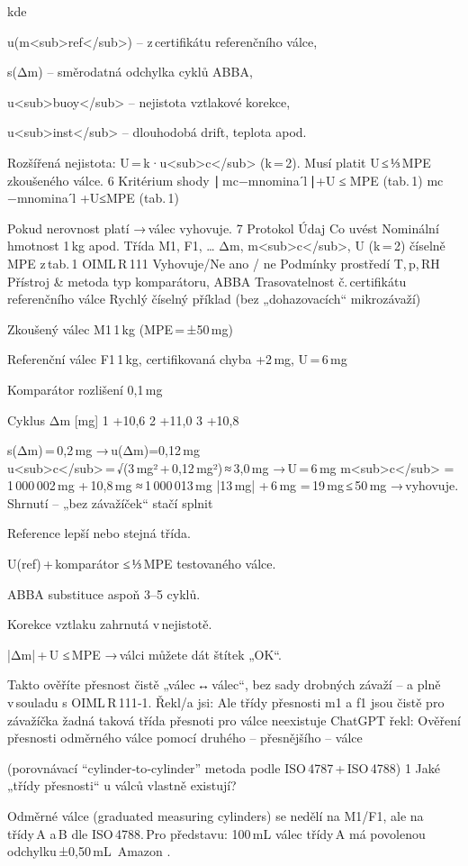 kde

    u(m<sub>ref</sub>) – z certifikátu referenčního válce,

    s(Δm) – směrodatná odchylka cyklů ABBA,

    u<sub>buoy</sub> – nejistota vztlakové korekce,

    u<sub>inst</sub> – dlouhodobá drift, teplota apod.

Rozšířená nejistota: U = k·u<sub>c</sub> (k = 2).
Musí platit U ≤ ⅓ MPE zkoušeného válce.
6  Kritérium shody
∣ mc−mnominaˊl ∣+U  ≤  MPE (tab. 1)
​mc​−mnominaˊl​
​+U≤MPE (tab. 1)

Pokud nerovnost platí → válec vyhovuje.
7  Protokol
Údaj	Co uvést
Nominální hmotnost	1 kg apod.
Třída	M1, F1, …
Δm, m<sub>c</sub>, U (k = 2)	číselně
MPE	z tab. 1 OIML R 111
Vyhovuje/Ne	ano / ne
Podmínky prostředí	T, p, RH
Přístroj & metoda	typ komparátoru, ABBA
Trasovatelnost	č. certifikátu referenčního válce
Rychlý číselný příklad (bez „dohazovacích“ mikrozávaží)

    Zkoušený válec M1 1 kg (MPE = ±50 mg)

    Referenční válec F1 1 kg, certifikovaná chyba +2 mg, U = 6 mg

    Komparátor rozlišení 0,1 mg

Cyklus	Δm [mg]
1	+10,6
2	+11,0
3	+10,8

s(Δm) = 0,2 mg → u(Δm)=0,12 mg
u<sub>c</sub> = √(3 mg² + 0,12 mg²) ≈ 3,0 mg → U = 6 mg
m<sub>c</sub> = 1 000 002 mg + 10,8 mg ≈ 1 000 013 mg
|13 mg| + 6 mg = 19 mg ≤ 50 mg → vyhovuje.
Shrnutí – „bez závažíček“ stačí splnit

    Reference lepší nebo stejná třída.

    U(ref) + komparátor ≤ ⅓ MPE testovaného válce.

    ABBA substituce aspoň 3–5 cyklů.

    Korekce vztlaku zahrnutá v nejistotě.

    |Δm| + U ≤ MPE → válci můžete dát štítek „OK“.

Takto ověříte přesnost čistě „válec ↔ válec“, bez sady drobných závaží – a plně v souladu s OIML R 111‑1.
Řekl/a jsi:
Ale třídy přesnosti m1 a f1 jsou čistě pro závažíčka žadná taková třída přesnoti pro válce neexistuje
ChatGPT řekl:
Ověření přesnosti odměrného válce pomocí druhého – přesnějšího – válce

(porovnávací “cylinder‑to‑cylinder” metoda podle ISO 4787 + ISO 4788)
1  Jaké „třídy přesnosti“ u válců vlastně existují?

Odměrné válce (graduated measuring cylinders) se nedělí na M1/F1, ale na třídy A a B dle ISO 4788. Pro představu: 100 mL válec třídy A má povolenou odchylku ±0,50 mL 
Amazon
.

